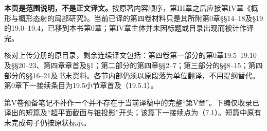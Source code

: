 \noindent\textbf{本页是范围说明，不是正文译文。}按原著内容顺序，第III章之后应接第IV章《概形与概形态射的局部研究》。当前已译的第四卷材料只是其所附第0章§§14--18及§19的19.0--19.4，已移到本书第0章；第IV章主体并未因标题或目录出现而被计作译完。

核对上传分册的原目录，剩余连续译文包括：第四卷第一部分的第0章19.5--19.10及§§20--23、第四章章首及§1；第二部分的第四章§§2--7；第三部分的§§8--15；第四部分的§§16--21及书末资料。各节内部仍须以原段落为单位翻译，不用提纲替代。第0章下一接续条目为19.5小节章首及（19.5.1）。

第V卷预备笔记不补作一个并不存在于当前译稿中的完整“第V章”。下编仅收录已译出的短篇及“超平面截面与锥投影”开头；该篇下一接续点为（7.1）。短篇中原有未完成句子仍按原状标示。
